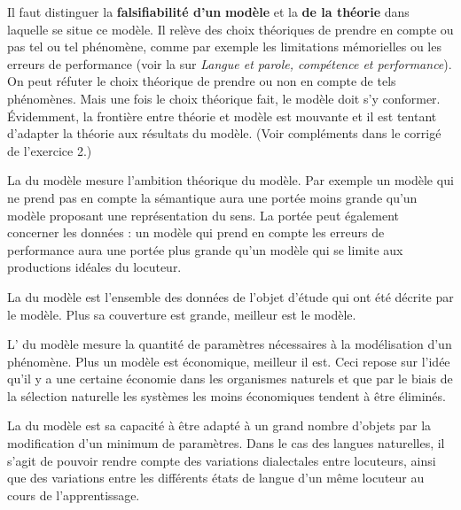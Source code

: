 Il faut distinguer la \textbf{falsifiabilité d’un} \textbf{modèle} et la  \textbf{de la théorie} dans laquelle se situe ce modèle. Il relève des choix théoriques de prendre en compte ou pas tel ou tel phénomène, comme par exemple les limitations mémorielles ou les erreurs de performance (voir la  sur \textit{Langue et parole, compétence et performance}). On peut réfuter le choix théorique de prendre ou non en compte de tels phénomènes. Mais une fois le choix théorique fait, le modèle doit s’y conformer. Évidemment, la frontière entre théorie et modèle est mouvante et il est tentant d’adapter la théorie aux résultats du modèle. (Voir compléments dans le corrigé de l’exercice 2.)

La  du modèle mesure l’ambition théorique du modèle. Par exemple un modèle qui ne prend pas en compte la sémantique aura une portée moins grande qu’un modèle proposant une représentation du sens. La portée peut également concerner les données : un modèle qui prend en compte les erreurs de performance aura une portée plus grande qu’un modèle qui se limite aux productions idéales du locuteur.

La  du modèle est l’ensemble des données de l’objet d’étude qui ont été décrite par le modèle. Plus sa couverture est grande, meilleur est le modèle.

L’ du modèle mesure la quantité de paramètres nécessaires à la modélisation d’un phénomène. Plus un modèle est économique, meilleur il est. Ceci repose sur l’idée qu’il y a une certaine économie dans les organismes naturels et que par le biais de la sélection naturelle les systèmes les moins économiques tendent à être éliminés.

La  du modèle est sa capacité à être adapté à un grand nombre d’objets par la modification d’un minimum de paramètres. Dans le cas des langues naturelles, il s’agit de pouvoir rendre compte des variations dialectales entre locuteurs, ainsi que des variations entre les différents états de langue d’un même locuteur au cours de l’apprentissage.


